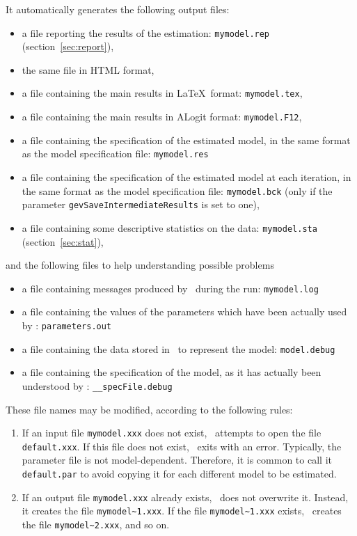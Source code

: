 \documentclass[12pt]{memoir}
\begin{document}
It automatically generates the following output files:
\begin{itemize}
   \item a file reporting the results of the estimation: \texttt{mymodel.rep} (section~\ref{sec:report}), 
   \item the same file in HTML format,
   \item a file containing the main results in \LaTeX\ format: \texttt{mymodel.tex},
   \item a file containing the main results in ALogit format: \texttt{mymodel.F12},
   \item a file containing the specification of the estimated model, in the same format as the model specification file: \texttt{mymodel.res} 
   \item a file containing the specification of the estimated model at each iteration, in the same format as the model specification file: \texttt{mymodel.bck} (only if the parameter \texttt{gevSaveIntermediateResults} is set to one), 
   \item a file containing some descriptive statistics on the data: \texttt{mymodel.sta} (section~\ref{sec:stat}),
\end{itemize}
and the following files to help understanding possible problems
\begin{itemize}
   \item a file containing messages produced by \BIOGEME\ during the run: \texttt{mymodel.log}
   \item a file containing the values of the parameters which have been actually used by \BIOGEME: \texttt{parameters.out}
   \item a file containing the data stored in \BIOGEME\ to represent
the model: \texttt{model.debug}
   \item a file containing the specification of the model, as it has actually been understood by \BIOGEME: \texttt{\_\_specFile.debug}
\end{itemize}

These file names may be modified, according to the following rules: 
\begin{enumerate}
   \item If an input file \verb+mymodel.xxx+ does not exist, \BIOGEME\
      attempts to open the file \verb+default.xxx+. If this file does not
      exist, \BIOGEME\ exits with an error. Typically, the parameter file
      is not model-dependent. Therefore, it is common to call it
      \texttt{default.par} to avoid copying it for each different model to
      be estimated.
   \item If an output file \verb+mymodel.xxx+ already exists, \BIOGEME\ does not overwrite it. 
      Instead, it creates the file \verb+mymodel~1.xxx+. If the file \verb+mymodel~1.xxx+ exists, 
      \BIOGEME\  creates the file \verb+mymodel~2.xxx+, and so on.
\end{enumerate}
\end{document}
